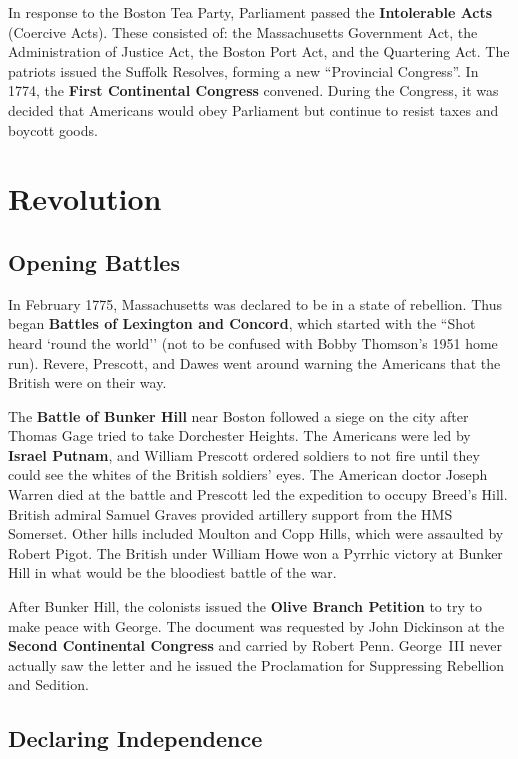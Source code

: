 In response to the Boston Tea Party,
Parliament passed the \textbf{Intolerable Acts} (Coercive Acts).
These consisted of:
the Massachusetts Government Act,
the Administration of Justice Act,
the Boston Port Act,
and the Quartering Act.
The patriots issued the Suffolk Resolves, forming a new ``Provincial Congress''.
In 1774, the \textbf{First Continental Congress} convened.
During the Congress,
it was decided that Americans would obey Parliament but continue to resist taxes and boycott goods.

\section{Revolution}

\subsection*{Opening Battles}

In February 1775, Massachusetts was declared to be in a state of rebellion.
Thus began \textbf{Battles of Lexington and Concord},
which started with the ``Shot heard `round the world''
(not to be confused with Bobby Thomson's 1951 home run).
Revere, Prescott, and Dawes went around warning the Americans that the British were on their way.

The \textbf{Battle of Bunker Hill} near Boston followed a siege on the city
after Thomas Gage tried to take Dorchester Heights.
The Americans were led by \textbf{Israel Putnam},
and William Prescott ordered soldiers to not fire
until they could see the whites of the British soldiers' eyes.
The American doctor Joseph Warren died at the battle
and Prescott led the expedition to occupy Breed's Hill.
British admiral Samuel Graves provided artillery support from the HMS Somerset.
Other hills included Moulton and Copp Hills, which were assaulted by Robert Pigot.
The British under William Howe won a Pyrrhic victory at Bunker Hill
in what would be the bloodiest battle of the war.

After Bunker Hill,
the colonists issued the \textbf{Olive Branch Petition} to try to make peace with George.
The document was requested by John Dickinson at the \textbf{Second Continental Congress}
and carried by Robert Penn.
George~III never actually saw the letter
and he issued the Proclamation for Suppressing Rebellion and Sedition.

\subsection*{Declaring Independence}

